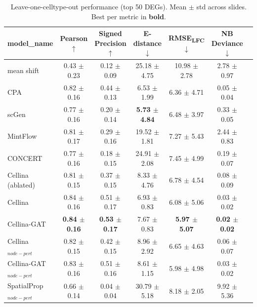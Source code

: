 \begin{table}[t]
\centering
\caption{Leave-one-celltype-out performance (top 50 DEGs). Mean $\pm$ std across slides. Best per metric in \textbf{bold}.}
\label{tab:loo_summary_merfish}
\begin{tabular}{lcccccc}
\toprule
model_name & Pearson $\uparrow$ & Signed Precision $\uparrow$ & E-distance $\downarrow$ & RMSE\textsubscript{LFC} $\downarrow$ & NB Deviance $\downarrow$ \\
\midrule
mean shift & 0.43 $\pm$ 0.23 & 0.12 $\pm$ 0.09 & 25.18 $\pm$ 4.75 & 10.98 $\pm$ 2.78 & 2.78 $\pm$ 0.97 \\
CPA & 0.82 $\pm$ 0.16 & 0.44 $\pm$ 0.13 & 6.53 $\pm$ 1.99 & 6.36 $\pm$ 4.71 & 0.05 $\pm$ 0.04 \\
scGen & 0.77 $\pm$ 0.16 & 0.20 $\pm$ 0.14 & \textbf{5.73 $\pm$ 4.84} & 6.48 $\pm$ 3.97 & 0.33 $\pm$ 0.05 \\
MintFlow & 0.81 $\pm$ 0.17 & 0.29 $\pm$ 0.16 & 19.52 $\pm$ 1.81 & 7.27 $\pm$ 5.43 & 2.44 $\pm$ 0.83 \\
CONCERT & 0.77 $\pm$ 0.16 & 0.18 $\pm$ 0.15 & 24.91 $\pm$ 2.08 & 7.45 $\pm$ 4.99 & 0.19 $\pm$ 0.07 \\
Cellina (ablated) & 0.81 $\pm$ 0.15 & 0.37 $\pm$ 0.15 & 8.33 $\pm$ 4.76 & 6.78 $\pm$ 4.54 & 0.08 $\pm$ 0.09 \\
Cellina & 0.84 $\pm$ 0.16 & 0.51 $\pm$ 0.17 & 6.93 $\pm$ 0.83 & 6.08 $\pm$ 5.06 & 0.03 $\pm$ 0.02 \\
Cellina-GAT & \textbf{0.84 $\pm$ 0.16} & \textbf{0.53 $\pm$ 0.17} & 7.67 $\pm$ 0.83 & \textbf{5.97 $\pm$ 5.07} & \textbf{0.02 $\pm$ 0.02} \\
Cellina$_{node-pert}$ & 0.82 $\pm$ 0.15 & 0.42 $\pm$ 0.15 & 8.96 $\pm$ 2.92 & 6.65 $\pm$ 4.63 & 0.06 $\pm$ 0.07 \\
Cellina-GAT$_{node-pert}$ & 0.83 $\pm$ 0.16 & 0.51 $\pm$ 0.16 & 8.61 $\pm$ 1.15 & 5.98 $\pm$ 4.98 & 0.03 $\pm$ 0.02 \\
SpatialProp$_{node-pert}$ & 0.66 $\pm$ 0.14 & 0.04 $\pm$ 0.04 & 30.79 $\pm$ 5.18 & 8.18 $\pm$ 2.05 & 9.92 $\pm$ 5.36 \\
\bottomrule
\end{tabular}
\end{table}
